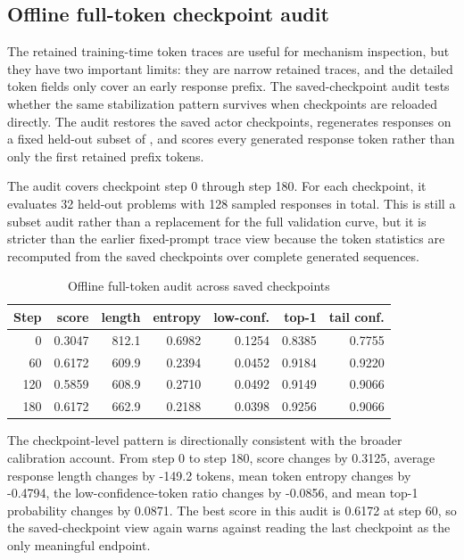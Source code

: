 \subsection{Offline full-token checkpoint audit}

The retained training-time token traces are useful for mechanism inspection, but they have two important limits: they are narrow retained traces, and the detailed token fields only cover an early response prefix. The saved-checkpoint audit tests whether the same stabilization pattern survives when checkpoints are reloaded directly. The audit restores the saved actor checkpoints, regenerates responses on a fixed held-out subset of \EvalSet{}, and scores every generated response token rather than only the first retained prefix tokens.

The audit covers checkpoint step 0 through step 180. For each checkpoint, it evaluates 32 held-out problems with 128 sampled responses in total. This is still a subset audit rather than a replacement for the full validation curve, but it is stricter than the earlier fixed-prompt trace view because the token statistics are recomputed from the saved checkpoints over complete generated sequences.

\begin{table}[H]
    \centering
    \caption{Offline full-token audit across saved checkpoints}
    \label{tab:en-full-token-ckpt-audit}
    \small
    \setlength{\tabcolsep}{4pt}
    \begin{tabular}{rrrrrrr}
        \toprule
        Step & score & length & entropy & low-conf. & top-1 & tail conf. \\
        \midrule
        0 & 0.3047 & 812.1 & 0.6982 & 0.1254 & 0.8385 & 0.7755 \\
        60 & 0.6172 & 609.9 & 0.2394 & 0.0452 & 0.9184 & 0.9220 \\
        120 & 0.5859 & 608.9 & 0.2710 & 0.0492 & 0.9149 & 0.9066 \\
        180 & 0.6172 & 662.9 & 0.2188 & 0.0398 & 0.9256 & 0.9066 \\
        \bottomrule
    \end{tabular}
\end{table}

The checkpoint-level pattern is directionally consistent with the broader calibration account. From step 0 to step 180, score changes by 0.3125, average response length changes by -149.2 tokens, mean token entropy changes by -0.4794, the low-confidence-token ratio changes by -0.0856, and mean top-1 probability changes by 0.0871. The best score in this audit is 0.6172 at step 60, so the saved-checkpoint view again warns against reading the last checkpoint as the only meaningful endpoint.

